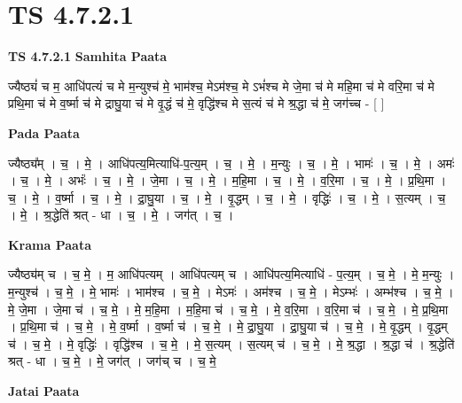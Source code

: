 \documentclass[17pt]{extarticle}
\begin{document}
\section{ TS 4.7.2.1 }

\textbf{TS 4.7.2.1 } \newline
\textbf{Samhita Paata} \newline

ज्यैष्ठ्यं॑ च म॒ आधि॑पत्यं च मे म॒न्युश्च॑ मे॒ भाम॑श्च॒ मेऽम॑श्च॒ मे ऽभं॑श्च मे जे॒मा च॑ मे महि॒मा च॑ मे वरि॒मा च॑ मे      प्रथि॒मा च॑ मे व॒र्ष्मा च॑ मे द्राघु॒या च॑ मे वृ॒द्धं च॑ मे॒      वृद्धि॑श्च मे स॒त्यं च॑ मे श्र॒द्धा च॑ मे॒ जग॑च्च - [  ] \newline

\textbf{Pada Paata} \newline

ज्यैष्ठ्य᳚म् । च॒ । मे॒ । आधि॑पत्य॒मित्याधि॑-प॒त्य॒म् । च॒ । मे॒ । म॒न्युः । च॒ । मे॒ । भामः॑ । च॒ । मे॒ । अमः॑ । च॒ । मे॒ । अभंः॑ । च॒ । मे॒ । जे॒मा । च॒ । मे॒ । म॒हि॒मा । च॒ । मे॒ । व॒रि॒मा । च॒ । मे॒ । प्र॒थि॒मा । च॒ । मे॒ । व॒र्ष्मा । च॒ । मे॒ । द्रा॒घु॒या । च॒ । मे॒ । वृ॒द्धम् । च॒ । मे॒ । वृद्धिः॑ । च॒ । मे॒ । स॒त्यम् । च॒ । मे॒ । श्र॒द्धेति॑ श्रत् - धा । च॒ । मे॒ । जग॑त् । च॒ ।  \newline


\textbf{Krama Paata} \newline

ज्यैष्ठ्य॑म् च । च॒ मे॒ । म॒ आधि॑पत्यम् । आधि॑पत्यम् च । आधि॑पत्य॒मित्याधि॑ - प॒त्य॒म् । च॒ मे॒ । मे॒ म॒न्युः । म॒न्युश्च॑ । च॒ मे॒ । मे॒ भामः॑ । भाम॑श्च । च॒ मे॒ । मेऽमः॑ । अम॑श्च । च॒ मे॒ । मेऽम्भः॑ । अम्भ॑श्च । च॒ मे॒ । मे॒ जे॒मा । जे॒मा च॑ । च॒ मे॒ । मे॒ म॒हि॒मा । म॒हि॒मा च॑ । च॒ मे॒ । मे॒ व॒रि॒मा । व॒रि॒मा च॑ । च॒ मे॒ । मे॒ प्र॒थि॒मा । प्र॒थि॒मा च॑ । च॒ मे॒ । मे॒ व॒र्ष्मा । व॒र्ष्मा च॑ । च॒ मे॒ । मे॒ द्रा॒घु॒या । द्रा॒घु॒या च॑ । च॒ मे॒ । मे॒ वृ॒द्धम् । वृ॒द्धम् च॑ । च॒ मे॒ । मे॒ वृद्धिः॑ । वृद्धि॑श्च । च॒ मे॒ । मे॒ स॒त्यम् । स॒त्यम् च॑ । च॒ मे॒ । मे॒ श्र॒द्धा । श्र॒द्धा च॑ । श्र॒द्धेति॑ श्रत् - धा । च॒ मे॒ । मे॒ जग॑त् । जग॑च् च । च॒ मे॒ \newline

\textbf{Jatai Paata} \newline
\end{document}
